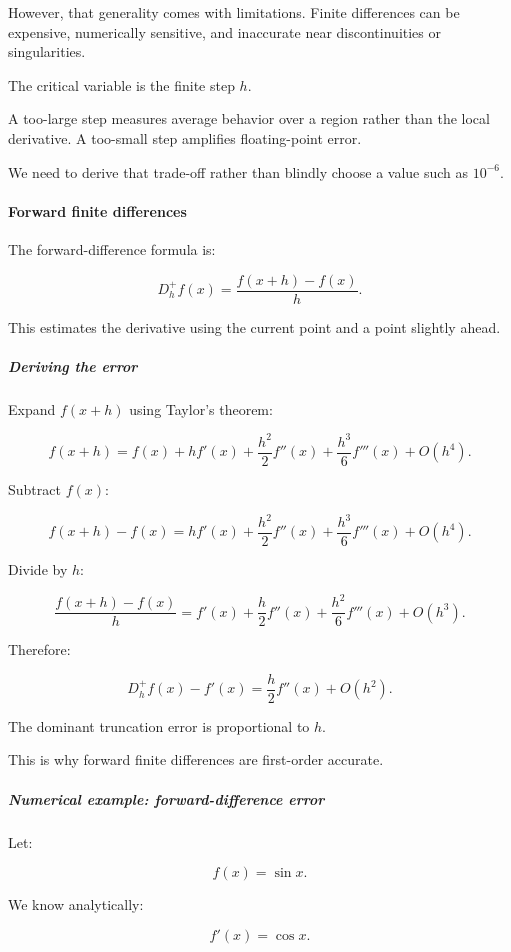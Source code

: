 However, that generality comes with limitations. Finite differences can be expensive, numerically sensitive, and inaccurate near discontinuities or singularities.

The critical variable is the finite step \(h\).

A too-large step measures average behavior over a region rather than the local derivative. A too-small step amplifies floating-point error.

We need to derive that trade-off rather than blindly choose a value such as \(10^{-6}\).

\paragraph{Forward finite differences}\label{02-foundations-ii-ch025-forward-finite-differences}

The forward-difference formula is:

\[
\boxed{ D_h^+f(x)=\frac{f(x+h)-f(x)}h }.
\]

This estimates the derivative using the current point and a point slightly ahead.

\subparagraph{Deriving the error}\label{02-foundations-ii-ch025-deriving-the-error}

Expand \(f(x+h)\) using Taylor's theorem:

\[
f(x+h) = f(x)+hf'(x)+ \frac{h^2}{2}f''(x)+ \frac{h^3}{6}f'''(x)+O(h^4).
\]

Subtract \(f(x)\):

\[
f(x+h)-f(x) = hf'(x)+ \frac{h^2}{2}f''(x)+ \frac{h^3}{6}f'''(x)+O(h^4).
\]

Divide by \(h\):

\[
\frac{f(x+h)-f(x)}h = f'(x)+ \frac h2f''(x)+ \frac{h^2}{6}f'''(x)+O(h^3).
\]

Therefore:

\[
\boxed{ D_h^+f(x)-f'(x) = \frac h2f''(x)+O(h^2) }.
\]

The dominant truncation error is proportional to \(h\).

This is why forward finite differences are first-order accurate.

\subparagraph{Numerical example: forward-difference error}\label{02-foundations-ii-ch025-numerical-example-forward-difference-error}

Let:

\[
f(x)=\sin x.
\]

We know analytically:

\[
f'(x)=\cos x.
\]

